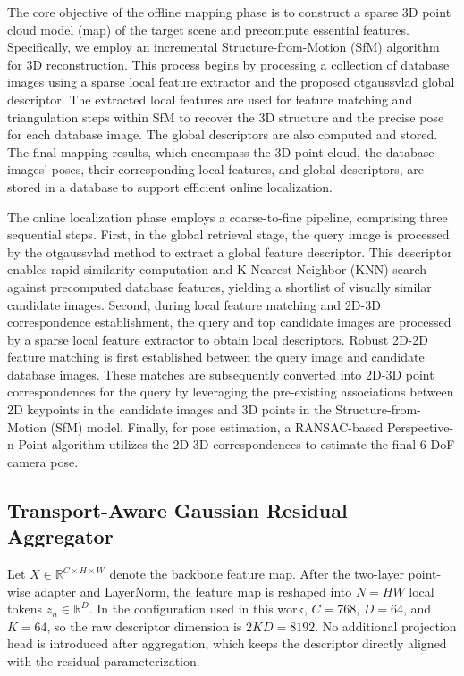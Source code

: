 \documentclass[journal]{IEEEtran}
\begin{document}
The core objective of the offline mapping phase is to construct a sparse 3D point cloud model (map) of the target scene and precompute essential features. Specifically, we employ an incremental Structure-from-Motion (SfM) algorithm for 3D reconstruction. This process begins by processing a collection of database images using a sparse local feature extractor and the proposed otgaussvlad global descriptor. The extracted local features are used for feature matching and triangulation steps within SfM to recover the 3D structure and the precise pose for each database image. The global descriptors are also computed and stored. The final mapping results, which encompass the 3D point cloud, the database images' poses, their corresponding local features, and global descriptors, are stored in a database to support efficient online localization.

The online localization phase employs a coarse-to-fine pipeline, comprising three sequential steps. First, in the global retrieval stage, the query image is processed by the otgaussvlad method to extract a global feature descriptor. This descriptor enables rapid similarity computation and K-Nearest Neighbor (KNN) search against precomputed database features, yielding a shortlist of visually similar candidate images. Second, during local feature matching and 2D-3D correspondence establishment, the query and top candidate images are processed by a sparse local feature extractor to obtain local descriptors. Robust 2D-2D feature matching is first established between the query image and candidate database images. These matches are subsequently converted into 2D-3D point correspondences for the query by leveraging the pre-existing associations between 2D keypoints in the candidate images and 3D points in the Structure-from-Motion (SfM) model. Finally, for pose estimation, a RANSAC-based Perspective-n-Point algorithm utilizes the 2D-3D correspondences to estimate the final 6-DoF camera pose. 



\subsection{Transport-Aware Gaussian Residual Aggregator}
Let \(X \in \mathbb{R}^{C \times H \times W}\) denote the backbone feature map. After the two-layer point-wise adapter and LayerNorm, the feature map is reshaped into \(N = HW\) local tokens \(z_n \in \mathbb{R}^D\). In the configuration used in this work, \(C = 768\), \(D = 64\), and \(K = 64\), so the raw descriptor dimension is \(2KD = 8192\). No additional projection head is introduced after aggregation, which keeps the descriptor directly aligned with the residual parameterization.
\end{document}
